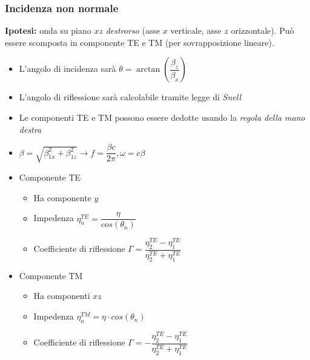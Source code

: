 \documentclass{article}
\begin{document}
\subsubsection{Incidenza non normale}
\textbf{Ipotesi:} onda su piano \(xz\) \textit{destrorso} (asse \(x\) verticale, asse \(z\) orizzontale). Può essere scomposta in componente TE e TM (per sovrapposizione lineare).
\begin{itemize}
	\item L'angolo di incidenza sarà \(\theta = \arctan\left(\dfrac{\beta_z}{\beta_x}\right)\)
	\item L'angolo di riflessione sarà calcolabile tramite legge di \textit{Snell}
	\item Le componenti TE e TM possono essere dedotte usando la \textit{regola della mano destra}
	\item \(\beta = \displaystyle \sqrt{\beta_{1x} ^ 2 + \beta_{1z} ^2} \rightarrow f = \dfrac{\beta c}{2 \pi}, \omega = c \beta \)
\end{itemize}
\begin{itemize}
	\item Componente TE
	\begin{itemize}
		\item Ha componente \(y\)
		\item Impedenza \( \displaystyle \eta^{TE}_n = \dfrac{\eta}{cos(\theta_n)} \)
		\item Coefficiente di riflessione \(\displaystyle \Gamma = \dfrac{\eta_{2}^{TE} - \eta_{1}^{TE}}{\eta_{2}^{TE} + \eta_{1}^{TE}} \)
	\end{itemize}
	\item Componente TM
	\begin{itemize}
		\item Ha componenti \(xz\)
		\item Impedenza \(\displaystyle \eta^{TM}_n = \eta \cdot cos(\theta_n) \)
		\item Coefficiente di riflessione \(\displaystyle \Gamma = - \dfrac{\eta_{2}^{TE} - \eta_{1}^{TE}}{\eta_{2}^{TE} + \eta_{1}^{TE}} \)
	\end{itemize}
\end{itemize}
\end{document}
